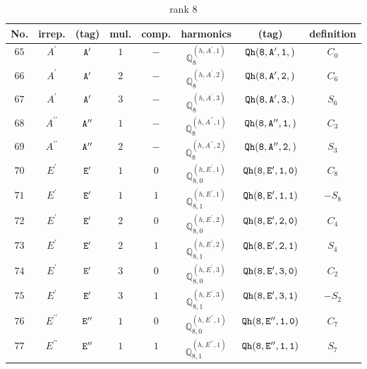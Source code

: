 \documentclass[fleqn,8pt]{jsarticle}
\begin{document}
\begin{table}[ht!]
\begin{center}
\caption{rank 8}
\renewcommand{\arraystretch}{1.3}
\begin{tabular}{cccccccc} \hline \hline
No. & irrep. & (tag) & mul. & comp. & harmonics & (tag) & definition \\ \hline
$ 65 $ & $ A^{\prime} $ & $ {\tt A'} $ & $ 1 $ & $ - $ & $ \mathbb{Q}_{8}^{(h,A^{\prime},1)} $ & $ {\tt Qh(8,A',1,)} $ & $ C_{0} $ \\
$ 66 $ & $ A^{\prime} $ & $ {\tt A'} $ & $ 2 $ & $ - $ & $ \mathbb{Q}_{8}^{(h,A^{\prime},2)} $ & $ {\tt Qh(8,A',2,)} $ & $ C_{6} $ \\
$ 67 $ & $ A^{\prime} $ & $ {\tt A'} $ & $ 3 $ & $ - $ & $ \mathbb{Q}_{8}^{(h,A^{\prime},3)} $ & $ {\tt Qh(8,A',3,)} $ & $ S_{6} $ \\
$ 68 $ & $ A^{\prime\prime} $ & $ {\tt A''} $ & $ 1 $ & $ - $ & $ \mathbb{Q}_{8}^{(h,A^{\prime\prime},1)} $ & $ {\tt Qh(8,A'',1,)} $ & $ C_{3} $ \\
$ 69 $ & $ A^{\prime\prime} $ & $ {\tt A''} $ & $ 2 $ & $ - $ & $ \mathbb{Q}_{8}^{(h,A^{\prime\prime},2)} $ & $ {\tt Qh(8,A'',2,)} $ & $ S_{3} $ \\
$ 70 $ & $ E^{\prime} $ & $ {\tt E'} $ & $ 1 $ & $ 0 $ & $ \mathbb{Q}_{8,0}^{(h,E^{\prime},1)} $ & $ {\tt Qh(8,E',1,0)} $ & $ C_{8} $ \\
$ 71 $ & $ E^{\prime} $ & $ {\tt E'} $ & $ 1 $ & $ 1 $ & $ \mathbb{Q}_{8,1}^{(h,E^{\prime},1)} $ & $ {\tt Qh(8,E',1,1)} $ & $ - S_{8} $ \\
$ 72 $ & $ E^{\prime} $ & $ {\tt E'} $ & $ 2 $ & $ 0 $ & $ \mathbb{Q}_{8,0}^{(h,E^{\prime},2)} $ & $ {\tt Qh(8,E',2,0)} $ & $ C_{4} $ \\
$ 73 $ & $ E^{\prime} $ & $ {\tt E'} $ & $ 2 $ & $ 1 $ & $ \mathbb{Q}_{8,1}^{(h,E^{\prime},2)} $ & $ {\tt Qh(8,E',2,1)} $ & $ S_{4} $ \\
$ 74 $ & $ E^{\prime} $ & $ {\tt E'} $ & $ 3 $ & $ 0 $ & $ \mathbb{Q}_{8,0}^{(h,E^{\prime},3)} $ & $ {\tt Qh(8,E',3,0)} $ & $ C_{2} $ \\
$ 75 $ & $ E^{\prime} $ & $ {\tt E'} $ & $ 3 $ & $ 1 $ & $ \mathbb{Q}_{8,1}^{(h,E^{\prime},3)} $ & $ {\tt Qh(8,E',3,1)} $ & $ - S_{2} $ \\
$ 76 $ & $ E^{\prime\prime} $ & $ {\tt E''} $ & $ 1 $ & $ 0 $ & $ \mathbb{Q}_{8,0}^{(h,E^{\prime\prime},1)} $ & $ {\tt Qh(8,E'',1,0)} $ & $ C_{7} $ \\
$ 77 $ & $ E^{\prime\prime} $ & $ {\tt E''} $ & $ 1 $ & $ 1 $ & $ \mathbb{Q}_{8,1}^{(h,E^{\prime\prime},1)} $ & $ {\tt Qh(8,E'',1,1)} $ & $ S_{7} $ \\

\end{tabular}
\end{center}
\end{table}
\end{document}
